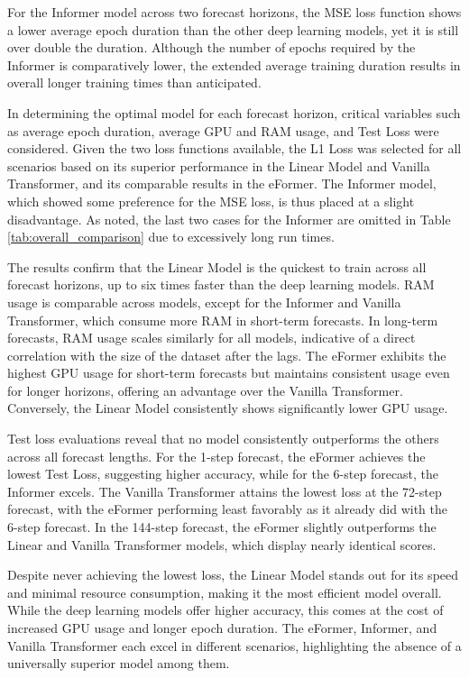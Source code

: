 \documentclass{article}
\begin{document}
For the Informer model across two forecast horizons, the MSE loss function shows a lower average epoch duration than the other deep learning models, yet it is still over double the duration. Although the number of epochs required by the Informer is comparatively lower, the extended average training duration results in overall longer training times than anticipated.

In determining the optimal model for each forecast horizon, critical variables such as average epoch duration, average GPU and RAM usage, and Test Loss were considered. Given the two loss functions available, the L1 Loss was selected for all scenarios based on its superior performance in the Linear Model and Vanilla Transformer, and its comparable results in the eFormer. The Informer model, which showed some preference for the MSE loss, is thus placed at a slight disadvantage. As noted, the last two cases for the Informer are omitted in Table \ref{tab:overall_comparison} due to excessively long run times.

The results confirm that the Linear Model is the quickest to train across all forecast horizons, up to six times faster than the deep learning models. RAM usage is comparable across models, except for the Informer and Vanilla Transformer, which consume more RAM in short-term forecasts. In long-term forecasts, RAM usage scales similarly for all models, indicative of a direct correlation with the size of the dataset after the lags. The eFormer exhibits the highest GPU usage for short-term forecasts but maintains consistent usage even for longer horizons, offering an advantage over the Vanilla Transformer. Conversely, the Linear Model consistently shows significantly lower GPU usage.

Test loss evaluations reveal that no model consistently outperforms the others across all forecast lengths. For the 1-step forecast, the eFormer achieves the lowest Test Loss, suggesting higher accuracy, while for the 6-step forecast, the Informer excels. The Vanilla Transformer attains the lowest loss at the 72-step forecast, with the eFormer performing least favorably as it already did with the 6-step forecast. In the 144-step forecast, the eFormer slightly outperforms the Linear and Vanilla Transformer models, which display nearly identical scores.

Despite never achieving the lowest loss, the Linear Model stands out for its speed and minimal resource consumption, making it the most efficient model overall. While the deep learning models offer higher accuracy, this comes at the cost of increased GPU usage and longer epoch duration. The eFormer, Informer, and Vanilla Transformer each excel in different scenarios, highlighting the absence of a universally superior model among them.
\end{document}
